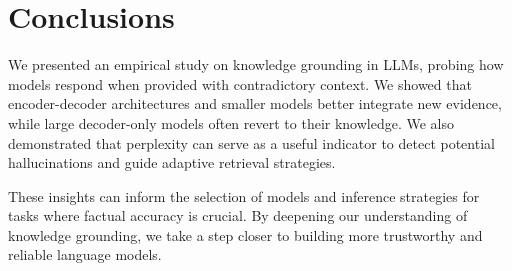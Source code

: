 \section{Conclusions}

We presented an empirical study on knowledge grounding in LLMs, probing how models respond when provided with contradictory context.
We showed that encoder-decoder architectures and smaller models better integrate new evidence, while large decoder-only models often revert to their \Parametric{} knowledge.
We also demonstrated that perplexity can serve as a useful indicator to detect potential hallucinations and guide adaptive retrieval strategies.

These insights can inform the selection of models and inference strategies for tasks where factual accuracy is crucial.
By deepening our understanding of knowledge grounding, we take a step closer to building more trustworthy and reliable language models.
